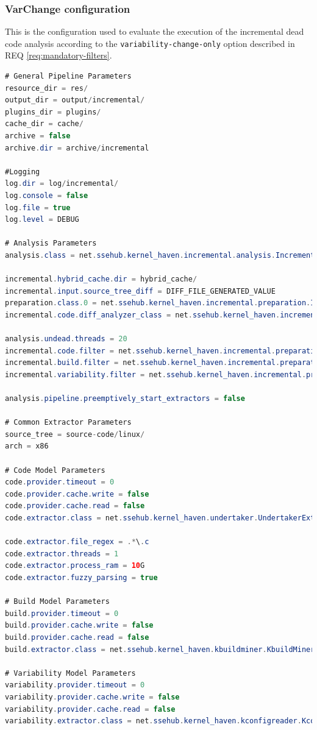 \documentclass[a4paper]{article}
\begin{document}
\subsubsection{VarChange configuration}

This is the configuration used to evaluate the execution of the incremental dead code analysis according to the \texttt{variability-change-only} option described in  REQ \ref{req:mandatory-filters}.

\begin{lstlisting}[language=java]
# General Pipeline Parameters 
resource_dir = res/
output_dir = output/incremental/
plugins_dir = plugins/
cache_dir = cache/
archive = false
archive.dir = archive/incremental

#Logging
log.dir = log/incremental/
log.console = false
log.file = true
log.level = DEBUG

# Analysis Parameters
analysis.class = net.ssehub.kernel_haven.incremental.analysis.IncrementalThreadedDeadCodeAnalysis

incremental.hybrid_cache.dir = hybrid_cache/
incremental.input.source_tree_diff = DIFF_FILE_GENERATED_VALUE
preparation.class.0 = net.ssehub.kernel_haven.incremental.preparation.IncrementalPreparation
incremental.code.diff_analyzer_class = net.ssehub.kernel_haven.incremental.diff.analyzer.VariabilityDiffAnalyzer

analysis.undead.threads = 20
incremental.code.filter = net.ssehub.kernel_haven.incremental.preparation.filter.VariabilityChangeFilter
incremental.build.filter = net.ssehub.kernel_haven.incremental.preparation.filter.VariabilityChangeFilter
incremental.variability.filter = net.ssehub.kernel_haven.incremental.preparation.filter.VariabilityChangeFilter

analysis.pipeline.preemptively_start_extractors = false

# Common Extractor Parameters
source_tree = source-code/linux/
arch = x86

# Code Model Parameters
code.provider.timeout = 0
code.provider.cache.write = false
code.provider.cache.read = false
code.extractor.class = net.ssehub.kernel_haven.undertaker.UndertakerExtractor

code.extractor.file_regex = .*\.c
code.extractor.threads = 1
code.extractor.process_ram = 10G
code.extractor.fuzzy_parsing = true

# Build Model Parameters 
build.provider.timeout = 0
build.provider.cache.write = false
build.provider.cache.read = false
build.extractor.class = net.ssehub.kernel_haven.kbuildminer.KbuildMinerExtractor

# Variability Model Parameters
variability.provider.timeout = 0
variability.provider.cache.write = false
variability.provider.cache.read = false
variability.extractor.class = net.ssehub.kernel_haven.kconfigreader.KconfigReaderExtractor
\end{lstlisting}
\end{document}
